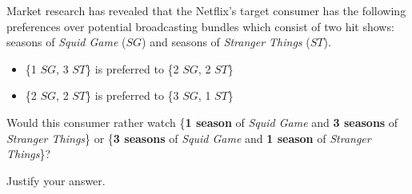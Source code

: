 \begin{question}[type=exam]{6}
  Market research has revealed that the Netflix's target consumer has the following preferences over potential broadcasting bundles which consist of two hit shows: 
  seasons of \textit{Squid Game} ($SG$) and seasons of \textit{Stranger Things} ($ST$).
  \begin{itemize}
    \item \{1 $SG$, 3 $ST$\} is preferred to \{2 $SG$, 2 $ST$\}
    \item \{2 $SG$, 2 $ST$\} is preferred to \{3 $SG$, 1 $ST$\}
  \end{itemize}
  Would this consumer rather watch \{\textbf{1 season} of \textit{Squid Game} and \textbf{3 seasons} of \textit{Stranger Things}\} or \{\textbf{3 seasons} of \textit{Squid Game} and \textbf{1 season} of \textit{Stranger Things}\}?

  Justify your answer.
\end{question}
